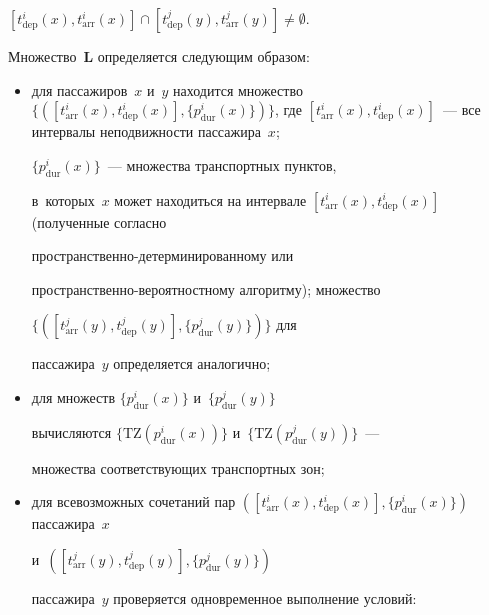$[t^i_{\mathrm{dep}}(x), t^i_{\mathrm{arr}}(x)] \cap [t^j_{\mathrm{dep}}(y), 


t^j_{\mathrm{arr}}(y)] \not=\emptyset$.





Множество~$\bm{L}$ определяется сле\-ду\-ющим образом:


\begin{itemize}


\item для пассажиров~$x$ и~$y$ находится множество $\{([t^i_{\mathrm{arr}}(x), 


t^i_{\mathrm{dep}}(x)], \{p^i_{\mathrm{dur}}(x)\})\}$, где $[t^i_{\mathrm{arr}}(x), 


t^i_{\mathrm{dep}}(x)]$~--- все интервалы не\-под\-виж\-ности пассажира~$x$; 


$\{p^i_{\mathrm{dur}}(x)\}$~--- множества транспортных пунктов, 


в~которых~$x$ может находиться на интервале $[t^i_{\mathrm{arr}}(x), 


t^i_{\mathrm{dep}}(x)]$ (полученные согласно  


про\-стран\-ст\-вен\-но-де\-тер\-ми\-ни\-ро\-ван\-но\-му или  


про\-стран\-ст\-вен\-но-ве\-ро\-ят\-но\-ст\-но\-му алгоритму); множество 


$\{([t^j_{\mathrm{arr}}(y), t^j_{\mathrm{dep}}(y)], \{p^j_{\mathrm{dur}}(y)\})\}$ для 


пассажира~$y$ определяется аналогично;


\item для множеств $\{p^i_{\mathrm{dur}}(x)\}$ и~$\{ p^j_{\mathrm{dur}}(y)\}$ 


вы\-чис\-ля\-ют\-ся $\{\mathrm{TZ}(p^i_{\mathrm{dur}}(x))\}$ и~$\{\mathrm{TZ}(p^j_{\mathrm{dur}}(y))\}$~--- 


множества со\-от\-вет\-ст\-ву\-ющих транспортных зон;


\item для всевозможных сочетаний пар $([t^i_{\mathrm{arr}}(x), 


t^i_{\mathrm{dep}}(x)], \{p^i_{\mathrm{dur}}(x)\})$ пассажира~$x$ 


и~$([t^j_{\mathrm{arr}}(y), t^j_{\mathrm{dep}}(y)], \{p^j_{\mathrm{dur}}(y)\})$ 


пассажира~$y$ проверяется одновременное выполнение условий:


\begin{align*}



\end{align*}
\end{itemize}
